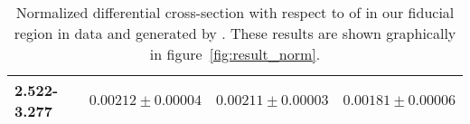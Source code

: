 \begin{table}
\begin{center}
\begin{tabular}{@{}l r r r@{}}
            2.522-3.277  &  $0.00212  \pm  0.00004$  &  $0.00211  \pm  0.00003$  &  $0.00181  \pm  0.00006$  \\
            \bottomrule
        \end{tabular}
    \end{center}
    \caption[
        Normalized differential cross-section with respect to \phistar of
        \Ztoee.
    ]{
        Normalized differential cross-section with respect to \phistar of
        \Ztoee in our fiducial region in data and generated by \MADGRAPH. These
        results are shown graphically in figure~\ref{fig:result_norm}.
    }
    \label{tab:results_norm}
\end{table}

